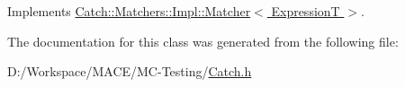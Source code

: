 Implements \hyperlink{struct_catch_1_1_matchers_1_1_impl_1_1_matcher_afd2469dc5c1869d67d4ad00d3b6388eb}{Catch\+::\+Matchers\+::\+Impl\+::\+Matcher$<$ Expression\+T $>$}.



The documentation for this class was generated from the following file\+:\begin{DoxyCompactItemize}
\item 
D\+:/\+Workspace/\+M\+A\+C\+E/\+M\+C-\/\+Testing/\hyperlink{_catch_8h}{Catch.\+h}\end{DoxyCompactItemize}
